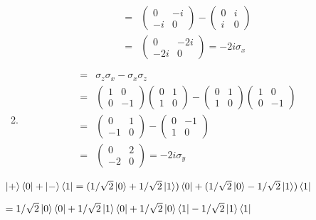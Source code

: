 \documentclass[letter,twoside,12pt]{article}
\begin{document}
\begin{enumerate}
\begin{enumerate}
\begin{eqnarray} [\sigma_y, \sigma_z ]
\\ &=& \begin{pmatrix} 0 & -i \\ -i & 0 \end{pmatrix}-\begin{pmatrix} 0 & i \\ i & 0 \end{pmatrix} \nonumber
\\ &=& \begin{pmatrix} 0 & -2i \\ -2i & 0 \end{pmatrix}= -2i\sigma_x\nonumber
\end{eqnarray}
\item \begin{eqnarray} [\sigma_z, \sigma_x ] &=& \sigma_z\sigma_x - \sigma_x\sigma_z \nonumber
\\ &=& \begin{pmatrix} 1 & 0 \\ 0 & -1 \end{pmatrix}\begin{pmatrix} 0 & 1 \\ 1 & 0 \end{pmatrix}-\begin{pmatrix} 0 & 1 \\ 1 & 0 \end{pmatrix}\begin{pmatrix} 1 & 0 \\ 0 & -1 \end{pmatrix} \nonumber
\\ &=& \begin{pmatrix} 0 & 1 \\ -1 & 0 \end{pmatrix}-\begin{pmatrix} 0 & -1 \\ 1 & 0 \end{pmatrix} \nonumber
\\ &=& \begin{pmatrix} 0 & 2 \\ -2 & 0 \end{pmatrix}= -2i\sigma_y\nonumber
\end{eqnarray}
\end{enumerate}
$ \ket{+}\bra{0}+\ket{-}\bra{1} =(1/\sqrt{2}\ket{0}+1/\sqrt{2}\ket{1})\bra{0} + (1/\sqrt{2}\ket{0}-1/\sqrt{2}\ket{1})\bra{1} $

$ = 1/\sqrt{2}\ket{0}\bra{0}+1/\sqrt{2}\ket{1}\bra{0}+1/\sqrt{2}\ket{0}\bra{1}-1/\sqrt{2}\ket{1}\bra{1}  $ 


\end{enumerate}
\end{document}
